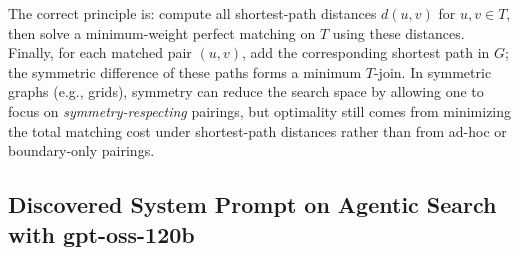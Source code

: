\documentclass{article}
\theoremstyle{plain}
\theoremstyle{definition}
\theoremstyle{remark}
\begin{document}
The correct principle is: compute all shortest-path distances \(d(u,v)\) for \(u,v\in T\), then solve a minimum-weight perfect matching on \(T\) using these distances.
Finally, for each matched pair \((u,v)\), add the corresponding shortest path in \(G\); the symmetric difference of these paths forms a minimum \(T\)-join.
In symmetric graphs (e.g., grids), symmetry can reduce the search space by allowing one to focus on \emph{symmetry-respecting} pairings, but optimality still comes from minimizing the total matching cost under shortest-path distances rather than from ad-hoc or boundary-only pairings.



\clearpage
\newpage


\subsection{Discovered System Prompt on Agentic Search with gpt-oss-120b}
\end{document}
